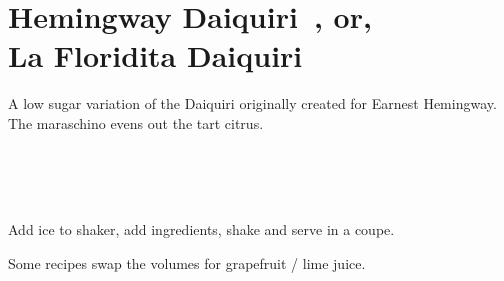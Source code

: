 \section[Hemingway Daiquiri]{Hemingway Daiquiri~\vegan, or,\\ La Floridita Daiquiri}


\begin{recipestats}[
	servings=1,
	preptime=5 \minute,
	source=Mike \& Jane,
	original=\citefield{howToDrinkHemingway2017}{shorttitle}\cite{howToDrinkHemingway2017},
]
\end{recipestats}


\begin{recipeabstract}
	A low sugar variation of the Daiquiri originally created for Earnest Hemingway.
	The maraschino evens out the tart citrus.
\end{recipeabstract}


\begin{ingredientcolumns}[1]
	\begin{ingredientblock}
		\\
		\\
		\\
	\end{ingredientblock}
\end{ingredientcolumns}


\begin{preparation}
\item Add ice to shaker, add ingredients, shake and serve in a coupe.
\end{preparation}


\begin{variation}
\item Some recipes swap the volumes for grapefruit / lime juice.
\end{variation}
\recipeend
